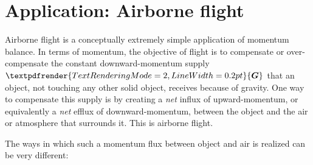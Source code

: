 \documentclass[a4paper,12pt,%
onecolumn,oneside,%
british%
]{memoir}
\renewcommand*{\bm}[1]{\textpdfrender{TextRenderingMode=2,LineWidth=0.2pt}{\boldsymbol{#1}}}
\renewcommand*{\|}[1][]{\nonscript\:#1\vert\nonscript\:\mathopen{}}
\newcommand*{\yG}{\bm{G}}
\begin{document}
\section{Application: Airborne flight}
\label{sec:bal_momentum_flight}

Airborne flight is a conceptually extremely simple application of momentum balance.
In terms of momentum, the objective of flight is to compensate or over-compensate the constant downward-momentum supply $\yG$ that an object, not touching any other solid object, receives because of gravity. One way to compensate this supply is by creating a \emph{net} influx of upward-momentum, or equivalently a \emph{net} efflux of downward-momentum, between the object and the air or atmosphere that surrounds it. This is airborne flight.

The ways in which such a momentum flux between object and air is realized can be very different:
\end{document}
